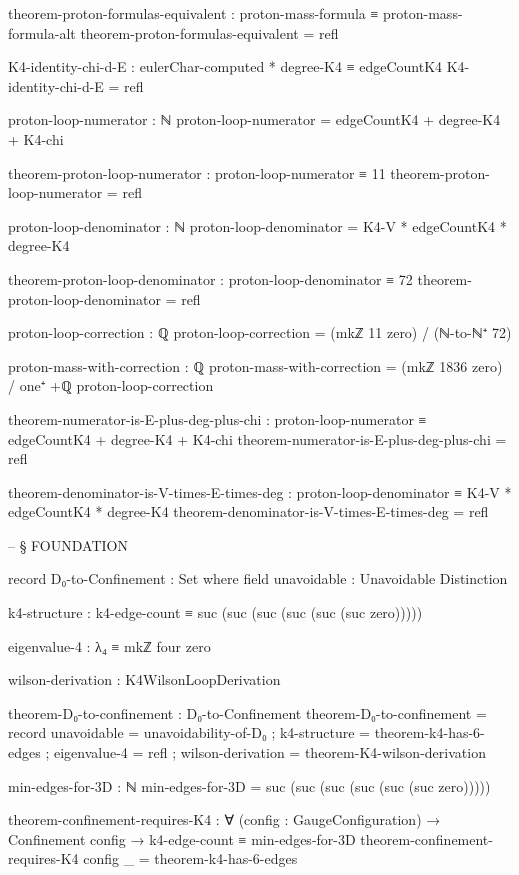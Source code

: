 \documentclass[11pt,a4paper]{book}
\begin{document}
\begin{code}
theorem-proton-formulas-equivalent : proton-mass-formula ≡ proton-mass-formula-alt
theorem-proton-formulas-equivalent = refl

K4-identity-chi-d-E : eulerChar-computed * degree-K4 ≡ edgeCountK4
K4-identity-chi-d-E = refl

proton-loop-numerator : ℕ
proton-loop-numerator = edgeCountK4 + degree-K4 + K4-chi

theorem-proton-loop-numerator : proton-loop-numerator ≡ 11
theorem-proton-loop-numerator = refl

proton-loop-denominator : ℕ
proton-loop-denominator = K4-V * edgeCountK4 * degree-K4

theorem-proton-loop-denominator : proton-loop-denominator ≡ 72
theorem-proton-loop-denominator = refl

proton-loop-correction : ℚ
proton-loop-correction = (mkℤ 11 zero) / (ℕ-to-ℕ⁺ 72)

proton-mass-with-correction : ℚ
proton-mass-with-correction = (mkℤ 1836 zero) / one⁺ +ℚ proton-loop-correction

theorem-numerator-is-E-plus-deg-plus-chi : proton-loop-numerator ≡ edgeCountK4 + degree-K4 + K4-chi
theorem-numerator-is-E-plus-deg-plus-chi = refl

theorem-denominator-is-V-times-E-times-deg : proton-loop-denominator ≡ K4-V * edgeCountK4 * degree-K4
theorem-denominator-is-V-times-E-times-deg = refl


-- § FOUNDATION

record D₀-to-Confinement : Set where
  field
    unavoidable : Unavoidable Distinction
    
    k4-structure : k4-edge-count ≡ suc (suc (suc (suc (suc (suc zero)))))
    
    eigenvalue-4 : λ₄ ≡ mkℤ four zero
    
    wilson-derivation : K4WilsonLoopDerivation

theorem-D₀-to-confinement : D₀-to-Confinement
theorem-D₀-to-confinement = record
  { unavoidable  = unavoidability-of-D₀
  ; k4-structure = theorem-k4-has-6-edges
  ; eigenvalue-4 = refl
  ; wilson-derivation = theorem-K4-wilson-derivation
  }

min-edges-for-3D : ℕ
min-edges-for-3D = suc (suc (suc (suc (suc (suc zero)))))

theorem-confinement-requires-K4 : ∀ (config : GaugeConfiguration) →
  Confinement config → 
  k4-edge-count ≡ min-edges-for-3D
theorem-confinement-requires-K4 config _ = theorem-k4-has-6-edges


\end{code}
\end{document}
